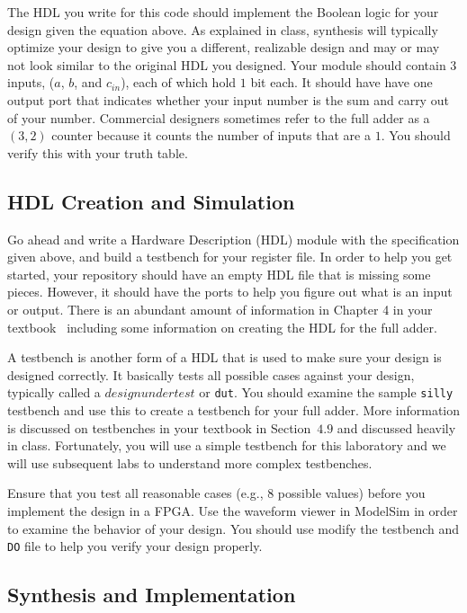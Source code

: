 \documentclass{article}
\begin{document}
The HDL you write for this code should implement the Boolean logic for
your design given the equation above.
As explained in class, synthesis will typically optimize
your design to give you a different, realizable design and may or may
not look similar to the original HDL you designed.
Your module should contain $3$ inputs, ($a$, $b$, and $c_{in}$), each of
which hold $1$
bit each. It should have have one output port that indicates whether your
input number is the sum and carry out of your number.  Commercial
designers sometimes refer to the full adder as a $(3,2)$ counter
because it counts the number of inputs that are a $1$.  You should
verify this with your truth table.

\subsection{HDL Creation and Simulation}

Go ahead and write a Hardware Description (HDL)
module with the specification given above, and
build a testbench for your register file. In order to help you get
started, your repository should have an empty HDL file that is
missing some pieces.  However, it should have the ports to help you
figure out what is an input or output.  There is
an abundant amount of information in Chapter 4 in your
textbook~\cite{ddca-riscv} including some information on creating
the HDL for the full adder.

A testbench is another form of a HDL that is used to make sure your
design is designed correctly.  It basically tests all possible cases
against your design, typically called a $design under test$ or
\verb!dut!.
You should examine the sample
\verb!silly! testbench and use this to create a testbench for your
full adder.  More information is discussed on testbenches in your
textbook in Section~$4.9$ and discussed heavily in class.
Fortunately, you will use a simple testbench for this laboratory and
we will use subsequent labs to understand more complex testbenches.

Ensure that you test all
reasonable cases (e.g., $8$ possible values) before you implement the
design in a FPGA. Use the
waveform viewer in ModelSim in order
to examine the behavior of your design.  You should use modify
the testbench and \verb+DO+ file to help you verify your design
properly.

\subsection{Synthesis and Implementation}
\end{document}
